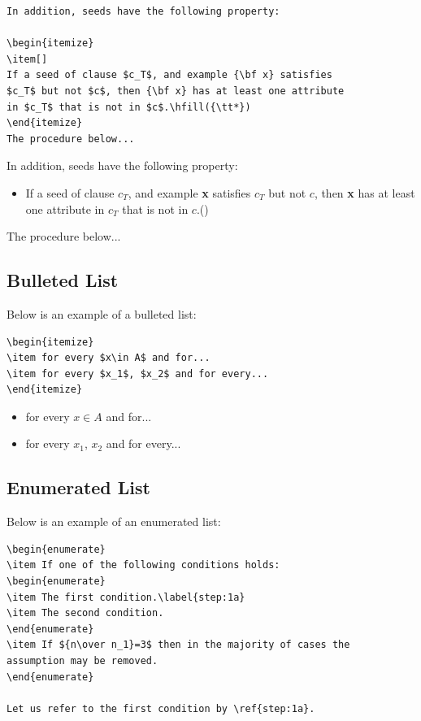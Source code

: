 \documentclass[theoremcontinuousnumbering,withtitlethanks]{actacyb}
\begin{document}
\begin{verbatim}
In addition, seeds have the following property:

\begin{itemize}
\item[] 
If a seed of clause $c_T$, and example {\bf x} satisfies 
$c_T$ but not $c$, then {\bf x} has at least one attribute 
in $c_T$ that is not in $c$.\hfill({\tt*})
\end{itemize}
The procedure below...
\end{verbatim}

In addition, seeds have the following property:

\begin{itemize}
\item[] 
If a seed of clause $c_T$, and example {\bf x} satisfies $c_T$ but
not $c$, then {\bf x} has at least one attribute in $c_T$ that
is not in $c$.\hfill({\tt*})
\end{itemize}
The procedure below...

\subsection{Bulleted List}

Below is an example of a bulleted list:

\begin{verbatim}
\begin{itemize}
\item for every $x\in A$ and for...
\item for every $x_1$, $x_2$ and for every...
\end{itemize} 
\end{verbatim}

\begin{itemize}
\item for every $x\in A$ and for...
\item for every $x_1$, $x_2$ and for every...
\end{itemize} 

\subsection{Enumerated List}
Below is an example of an enumerated list:

\begin{verbatim}
\begin{enumerate}
\item If one of the following conditions holds:
\begin{enumerate}
\item The first condition.\label{step:1a}
\item The second condition.
\end{enumerate}
\item If ${n\over n_1}=3$ then in the majority of cases the 
assumption may be removed.
\end{enumerate}

Let us refer to the first condition by \ref{step:1a}.
\end{verbatim}
\end{document}
